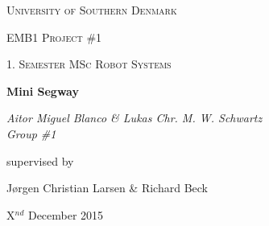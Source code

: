 \documentclass[12pt,a4paper]{article}
\begin{document}
\begin{titlepage}
	\centering
	\vfill
	{\scshape\LARGE University of Southern Denmark\par}
	\vspace{1cm}
	{\scshape\Large EMB1 Project \#1\par}
	{\scshape\large 1. Semester MSc Robot Systems\par}
	\vspace{1.5cm}
	{\huge\bfseries Mini Segway\par}
	\vspace{2cm}
	{\Large\itshape Aitor Miguel Blanco \& Lukas Chr. M. W. Schwartz \\ Group \#1 \par}
	\vfill
	supervised by\par
	J\o rgen Christian Larsen \& Richard Beck

	\vspace{2cm}

	{\large X$^{nd}$ December 2015 \par}
\end{titlepage}

\pagebreak










%


%
%

%
%

%

%

\end{document}
